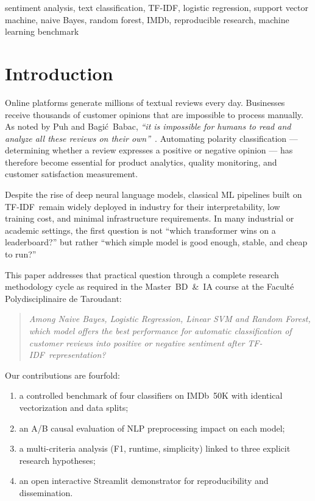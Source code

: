 \documentclass[conference]{IEEEtran}
\newcommand{\TFIDF}{TF-IDF}
\begin{document}
\begin{IEEEkeywords}
sentiment analysis, text classification, TF-IDF, logistic
regression, support vector machine, naive Bayes, random forest,
IMDb, reproducible research, machine learning benchmark
\end{IEEEkeywords}

\section{Introduction}

Online platforms generate millions of textual reviews every day.
Businesses receive thousands of customer opinions that are
impossible to process manually.
As noted by Puh and Bagi\'c~Babac, \textit{``it is impossible for
humans to read and analyze all these reviews on their
own''}~\cite{puh2023}.
Automating polarity classification --- determining whether a
review expresses a positive or negative opinion --- has therefore
become essential for product analytics, quality monitoring, and
customer satisfaction measurement.

Despite the rise of deep neural language models, classical ML
pipelines built on \TFIDF\ remain widely deployed in industry for
their interpretability, low training cost, and minimal
infrastructure requirements.
In many industrial or academic settings, the first question is
not ``which transformer wins on a leaderboard?'' but rather
``which simple model is good enough, stable, and cheap to run?''

This paper addresses that practical question through a complete
research methodology cycle as required in the Master~BD~\&~IA
course at the Facult\'e Polydisciplinaire de Taroudant:

\begin{quote}
\textit{Among Naive Bayes, Logistic Regression, Linear SVM and
Random Forest, which model offers the best performance for
automatic classification of customer reviews into positive or
negative sentiment after \TFIDF\ representation?}
\end{quote}

Our contributions are fourfold:
\begin{enumerate}
  \item a controlled benchmark of four classifiers on IMDb~50K
        with identical vectorization and data splits;
  \item an A/B causal evaluation of NLP preprocessing impact on
        each model;
  \item a multi-criteria analysis (F1, runtime, simplicity)
        linked to three explicit research hypotheses;
  \item an open interactive Streamlit demonstrator for
        reproducibility and dissemination.
\end{enumerate}
\end{document}
